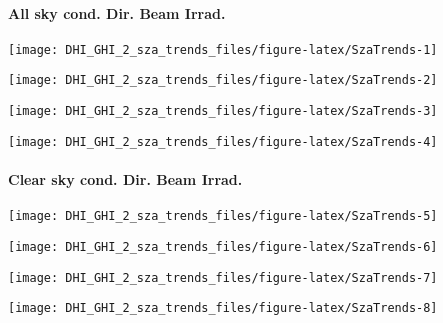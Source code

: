 \documentclass[
  10pt,
  a4paper,oneside]{article}
\begin{document}
\newpage

\hypertarget{all-sky-cond.-dir.-beam-irrad.}{%
\paragraph{All sky cond. Dir. Beam Irrad.}\label{all-sky-cond.-dir.-beam-irrad.}}

\begin{center}\texttt{[image: DHI\_GHI\_2\_sza\_trends\_files/figure-latex/SzaTrends-1]} \end{center}

\begin{center}\texttt{[image: DHI\_GHI\_2\_sza\_trends\_files/figure-latex/SzaTrends-2]} \end{center}

\begin{center}\texttt{[image: DHI\_GHI\_2\_sza\_trends\_files/figure-latex/SzaTrends-3]} \end{center}

\begin{center}\texttt{[image: DHI\_GHI\_2\_sza\_trends\_files/figure-latex/SzaTrends-4]} \end{center}

\newpage

\hypertarget{clear-sky-cond.-dir.-beam-irrad.}{%
\paragraph{Clear sky cond. Dir. Beam Irrad.}\label{clear-sky-cond.-dir.-beam-irrad.}}

\begin{center}\texttt{[image: DHI\_GHI\_2\_sza\_trends\_files/figure-latex/SzaTrends-5]} \end{center}

\begin{center}\texttt{[image: DHI\_GHI\_2\_sza\_trends\_files/figure-latex/SzaTrends-6]} \end{center}

\begin{center}\texttt{[image: DHI\_GHI\_2\_sza\_trends\_files/figure-latex/SzaTrends-7]} \end{center}

\begin{center}\texttt{[image: DHI\_GHI\_2\_sza\_trends\_files/figure-latex/SzaTrends-8]} \end{center}
\end{document}
